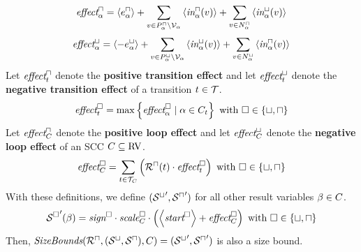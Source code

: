 \begin{theorem}
  \[ \emph{effect}^\sqcap_\alpha = \left\langle e^{\sqcap}_\alpha \right\rangle + \sum_{v \in P_\alpha^\sqcap \setminus \mathcal{V}_\alpha} \left\langle \emph{in}^\sqcap_\alpha(v) \right\rangle + \sum_{v \in N_\alpha^\sqcap} \left\langle \emph{in}^\sqcup_\alpha(v) \right\rangle \]
  \[ \emph{effect}^\sqcup_\alpha = \left\langle -e^{\sqcup}_\alpha \right\rangle + \sum_{v \in P_\alpha^\sqcup \setminus \mathcal{V}_\alpha} \left\langle \emph{in}^\sqcup_\alpha(v) \right\rangle + \sum_{v \in N_\alpha^\sqcup} \left\langle \emph{in}^\sqcap_\alpha(v) \right\rangle \]
  Let $\emph{effect}^\sqcap_t$ denote the \textbf{positive transition effect} and let $\emph{effect}^\sqcup_t$ denote the \textbf{negative transition effect} of a transition $t \in \mathcal{T}$.
  \[ \emph{effect}^\square_t = \max \left\lbrace \emph{effect}^\square_\alpha \mid \alpha \in C_t  \right\rbrace \text{ with } \square \in \lbrace \sqcup, \sqcap \rbrace \]
  Let $\emph{effect}^\sqcap_C$ denote the \textbf{positive loop effect} and let $\emph{effect}^\sqcup_C$ denote the \textbf{negative loop effect} of an SCC $C \subseteq \text{RV}$.
  \[ \emph{effect}^\square_C = \sum_{t \in \mathcal{T}_C} \left( {\mathcal{R}^\sqcap}(t) \cdot \emph{effect}^\square_t \right) \text{ with } \square \in \lbrace \sqcup, \sqcap \rbrace \]
  With these definitions, we define $({\mathcal{S}^\sqcup}', {\mathcal{S}^\sqcap}')$ for all other result variables $\beta \in C$.
  \[ {\mathcal{S}^\square}'(\beta) = \emph{sign}^\square \cdot \emph{scale}^\square_C \cdot \left( \left\langle \emph{start}^\square \right\rangle + \emph{effect}^\square_C \right) \text{ with } \square \in \lbrace \sqcup, \sqcap \rbrace \]
  Then, $\emph{SizeBounds}({\mathcal{R}^\sqcap}, {({\mathcal{S}^\sqcup}, {\mathcal{S}^\sqcap})}, C) = ({\mathcal{S}^\sqcup}', {\mathcal{S}^\sqcap}')$ is also a size bound. 
\end{theorem}

